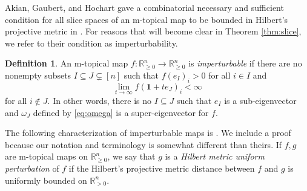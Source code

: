 \documentclass[10pt,reqno]{amsart}
\newcommand{\R}{\mathbb{R}}
\newcommand{\supp}{\operatorname{supp}}
\newcommand{\sign}{\operatorname{sgn}}
\theoremstyle{plain}
\theoremstyle{definition}
\newtheorem{definition}[theorem]{Definition}
\numberwithin{equation}{section}
\begin{document}
Akian, Gaubert, and Hochart gave a combinatorial necessary and sufficient condition for all slice spaces of an m-topical map to be bounded in Hilbert's projective metric in \cite{AkianGaubertHochart20}. For reasons that will become clear in Theorem \ref{thm:slice}, we refer to their condition as imperturbability. 

\begin{definition} \label{def:imperturb}
An m-topical map $f:\R^n_{\ge 0} \rightarrow \R^n_{\ge 0}$ is \emph{imperturbable}
if there are no nonempty subsets $I \subseteq J \subsetneq [n]$ such that $f(e_I)_i > 0$ for all $i \in I$ and 
$$\lim_{t \rightarrow \infty} f(\mathbf{1} + t e_J)_i < \infty$$
for all $i \notin J$. In other words, there is no $I \subseteq J$ such that $e_I$ is a sub-eigenvector and $\omega_J$ defined by \eqref{eq:omega} is a super-eigenvector for $f$. 
\end{definition}

The following characterization of imperturbable maps is \cite[Theorem 1.2]{AkianGaubertHochart20}. 
We include a proof because our notation and terminology is somewhat different than theirs. 
If $f, g$ are m-topical maps on $\R^n_{\ge 0}$, we say that $g$ is a \emph{Hilbert metric uniform perturbation} of $f$ if the Hilbert's projective metric distance between $f$ and $g$ is uniformly bounded on $\R^n_{>0}$.  
\end{document}
